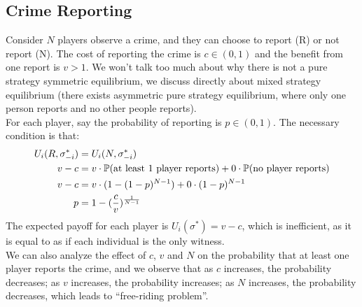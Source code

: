 \subsection{Crime Reporting}
Consider $N$ players observe a crime, and they can choose to report (R) or not report (N). The cost of reporting the crime is $c \in (0, 1)$ and the benefit from one report is $v > 1$. We won't talk too much about why there is not a pure strategy symmetric equilibrium, we discuss directly about mixed strategy equilibrium (there exists asymmetric pure strategy equilibrium, where only one person reports and no other people reports). \\
For each player, say the probability of reporting is $p \in (0, 1)$. The necessary condition is that:
\begin{align*}
    U_i(R, \sigma_{-i}^*) &= U_i(N, \sigma_{-i}^*) \\
    v - c &= v \cdot \mathbb{P}(\text{at least 1 player reports}) + 0 \cdot \mathbb{P}(\text{no player reports}) \\
    v - c &= v \cdot (1 - (1 - p)^{N - 1}) + 0 \cdot (1 - p)^{N - 1} \\
    p &= 1 - (\frac{c}{v})^{\frac{1}{N - 1}}
\end{align*}
The expected payoff for each player is $U_i(\sigma^*) = v - c$, which is inefficient, as it is equal to as if each individual is the only witness. \\
We can also analyze the effect of $c$, $v$ and $N$ on the probability that at least one player reports the crime, and we observe that as $c$ increases, the probability decreases; as $v$ increases, the probability increases; as $N$ increases, the probability decreases, which leads to ``free-riding problem''.

